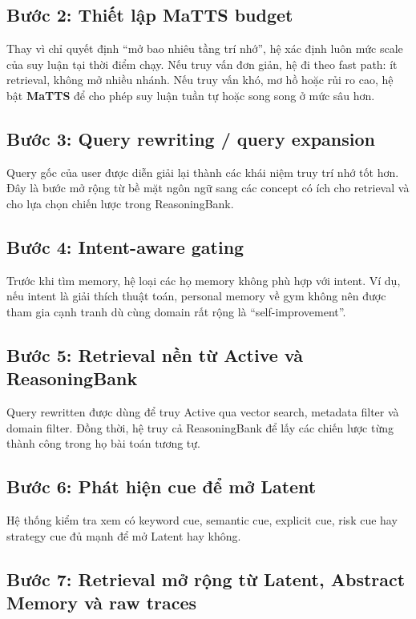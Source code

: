\documentclass[a4paper,12pt]{article}
\begin{document}
\subsection*{Bước 2: Thiết lập MaTTS budget}

Thay vì chỉ quyết định ``mở bao nhiêu tầng trí nhớ'', hệ xác định luôn mức scale của suy luận tại thời điểm chạy. Nếu truy vấn đơn giản, hệ đi theo fast path: ít retrieval, không mở nhiều nhánh. Nếu truy vấn khó, mơ hồ hoặc rủi ro cao, hệ bật \textbf{MaTTS} để cho phép suy luận tuần tự hoặc song song ở mức sâu hơn.

\subsection*{Bước 3: Query rewriting / query expansion}

Query gốc của user được diễn giải lại thành các khái niệm truy trí nhớ tốt hơn. Đây là bước mở rộng từ bề mặt ngôn ngữ sang các concept có ích cho retrieval và cho lựa chọn chiến lược trong ReasoningBank.

\subsection*{Bước 4: Intent-aware gating}

Trước khi tìm memory, hệ loại các họ memory không phù hợp với intent. Ví dụ, nếu intent là giải thích thuật toán, personal memory về gym không nên được tham gia cạnh tranh dù cùng domain rất rộng là ``self-improvement''.

\subsection*{Bước 5: Retrieval nền từ Active và ReasoningBank}

Query rewritten được dùng để truy Active qua vector search, metadata filter và domain filter. Đồng thời, hệ truy cả ReasoningBank để lấy các chiến lược từng thành công trong họ bài toán tương tự.

\subsection*{Bước 6: Phát hiện cue để mở Latent}

Hệ thống kiểm tra xem có keyword cue, semantic cue, explicit cue, risk cue hay strategy cue đủ mạnh để mở Latent hay không.

\subsection*{Bước 7: Retrieval mở rộng từ Latent, Abstract Memory và raw traces}
\end{document}
